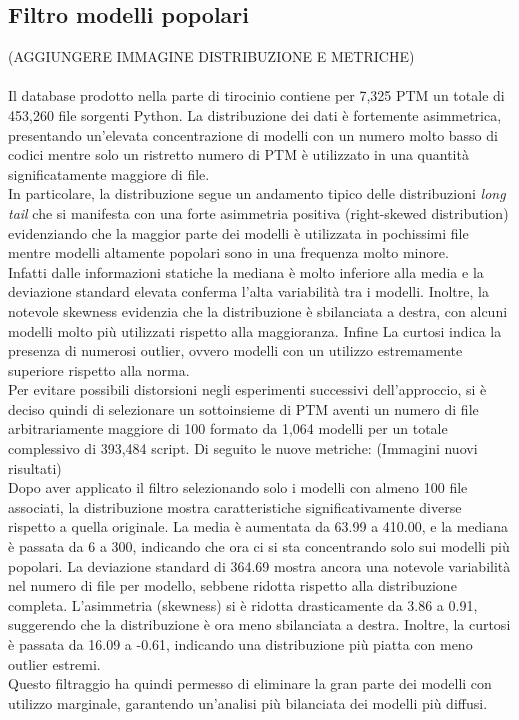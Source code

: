 \documentclass{article}
\begin{document}
\subsection{Filtro modelli popolari}
(AGGIUNGERE IMMAGINE DISTRIBUZIONE E METRICHE)\\
\\
Il database prodotto nella parte di tirocinio contiene per 7,325 PTM un totale di 453,260 file sorgenti Python. La distribuzione dei dati è fortemente asimmetrica, presentando un'elevata concentrazione di modelli con un numero molto basso di codici mentre solo un ristretto numero di PTM è utilizzato in una quantità significatamente maggiore di file.\\
In particolare, la distribuzione segue un andamento tipico delle distribuzioni \textit{long tail} che si manifesta con una forte asimmetria positiva (right-skewed distribution) evidenziando che la maggior parte dei modelli è utilizzata in pochissimi file mentre modelli altamente popolari sono in una frequenza molto minore.\\
Infatti dalle informazioni statiche la mediana è molto inferiore alla media e la deviazione standard elevata conferma l'alta variabilità tra i modelli. Inoltre, la notevole skewness evidenzia che la distribuzione è sbilanciata a destra, con alcuni modelli molto più utilizzati rispetto alla maggioranza. Infine La curtosi indica la presenza di numerosi outlier, ovvero modelli con un utilizzo estremamente superiore rispetto alla norma.\\
Per evitare possibili distorsioni negli esperimenti successivi dell'approccio, si è deciso quindi di selezionare un sottoinsieme di PTM aventi un numero di file arbitrariamente maggiore di 100 formato da 1,064 modelli per un totale complessivo di 393,484 script. Di seguito le nuove metriche:
(Immagini nuovi risultati)\\
Dopo aver applicato il filtro selezionando solo i modelli con almeno 100 file associati, la distribuzione mostra caratteristiche significativamente diverse rispetto a quella originale. La media è aumentata da 63.99 a 410.00, e la mediana è passata da 6 a 300, indicando che ora ci si sta concentrando solo sui modelli più popolari.
La deviazione standard di 364.69 mostra ancora una notevole variabilità nel numero di file per modello, sebbene ridotta rispetto alla distribuzione completa. L’asimmetria (skewness) si è ridotta drasticamente da 3.86 a 0.91, suggerendo che la distribuzione è ora meno sbilanciata a destra. Inoltre, la curtosi è passata da 16.09 a -0.61, indicando una distribuzione più piatta con meno outlier estremi.\\
Questo filtraggio ha quindi permesso di eliminare la gran parte dei modelli con utilizzo marginale, garantendo un'analisi più bilanciata dei modelli più diffusi.
\end{document}
